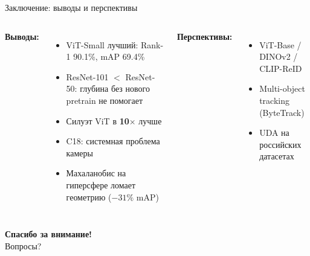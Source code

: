 \documentclass[aspectratio=169,12pt]{beamer}
\begin{document}
\begin{frame}{Заключение: выводы и перспективы}
  \begin{columns}[T,onlytextwidth]
    \textbf{Выводы:}
    \begin{itemize}\setlength{\itemsep}{6pt}
      \item ViT-Small лучший: Rank-1 90.1\%, mAP 69.4\%
      \item ResNet-101 $<$ ResNet-50: глубина без нового pretrain не помогает
      \item Силуэт ViT в \textbf{10$\times$} лучше
      \item C18: системная проблема камеры
      \item Махаланобис на гиперсфере ломает геометрию ($-31\%$ mAP)
    \end{itemize}
    \textbf{Перспективы:}
    \begin{itemize}\setlength{\itemsep}{6pt}
      \item ViT-Base / DINOv2 / CLIP-ReID
      \item Multi-object tracking (ByteTrack)
      \item UDA на российских датасетах
    \end{itemize}
  \end{columns}
\end{frame}

{
\begin{frame}[plain]
  \vspace{2em}
  \begin{center}
    {\LARGE\bfseries\color{white} Спасибо за внимание!}\\[0.8em]
    {\large\color{miptlight} Вопросы?}
  \end{center}
\end{frame}
}
\end{document}
